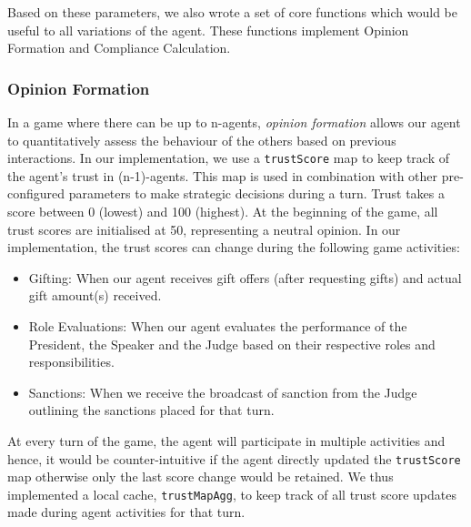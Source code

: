Based on these parameters, we also wrote a set of core functions which would be useful to all variations of the agent. These functions implement Opinion Formation and Compliance Calculation.


\subsubsection*{Opinion Formation} \label{section_opinion_formation}
In a game where there can be up to n-agents, \textit{opinion formation} allows our agent to quantitatively assess the behaviour of the others based on previous interactions. %
In our implementation, we use a \texttt{trustScore} map to keep track of the agent's trust in (n-1)-agents. This map is used in combination with other pre-configured parameters to make strategic decisions during a turn. 
Trust takes a score between 0 (lowest) and 100 (highest). At the beginning of the game, all trust scores are initialised at 50, representing a neutral opinion. In our implementation, the trust scores can change during the following game activities:

\begin{itemize}
    \item Gifting: When our agent receives gift offers (after requesting gifts) and actual gift amount(s) received.
    \item Role Evaluations: When our agent evaluates the performance of the President, the Speaker and the Judge based on their respective roles and responsibilities.
    \item Sanctions: When we receive the broadcast of sanction from the Judge outlining the sanctions placed for that turn.
\end{itemize}


At every turn of the game, the agent will participate in multiple activities and hence, it would be counter-intuitive if the agent directly updated the \texttt{trustScore} map otherwise only the last score change would be retained. We thus implemented a local cache, \texttt{trustMapAgg}, to keep track of all trust score updates made during agent activities for that turn. 

